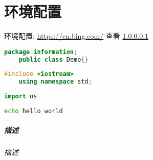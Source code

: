 \chapter{环境配置}

环境配置: \url{https://cn.bing.com/}
查看 \ref{1}

\ttfamily
\begin{lstlisting}[language=java]
    package information;
    public class Demo{}
\end{lstlisting}

\begin{lstlisting}[language=c++]
    #include <iostream>
    using namespace std;
\end{lstlisting}

\begin{lstlisting}[language=python]
    import os
\end{lstlisting}

\begin{lstlisting}[language=bash]
    echo hello world
\end{lstlisting}

\newpage
\paragraph{
    描述
}
\label{1}
\subparagraph{
    描述
}